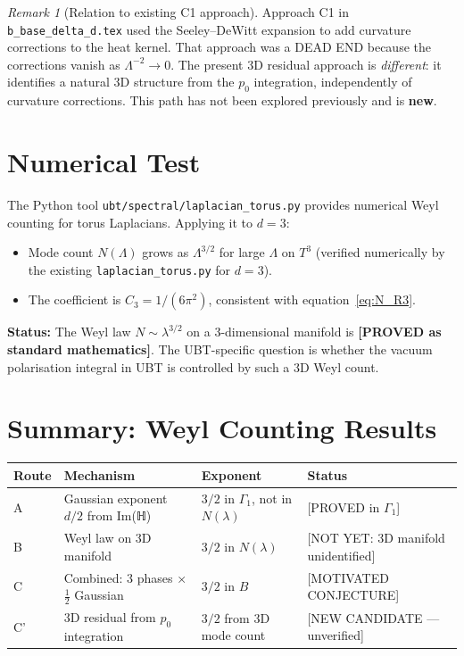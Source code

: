 \documentclass[11pt,a4paper]{article}
\theoremstyle{definition}
\theoremstyle{remark}
\newtheorem{remark}{Remark}
\begin{document}
\begin{remark}[Relation to existing C1 approach]
  Approach C1 in \texttt{b\_base\_delta\_d.tex} used the Seeley–DeWitt expansion
  to add curvature corrections to the heat kernel.
  That approach was a DEAD END because the corrections vanish as $\Lambda^{-2} \to 0$.
  The present 3D residual approach is \emph{different}: it identifies a natural
  3D structure from the $p_0$ integration, independently of curvature corrections.
  This path has not been explored previously and is \textbf{new}.
\end{remark}

\section{Numerical Test}
\label{sec:numerical}

The Python tool \texttt{ubt/spectral/laplacian\_torus.py} provides
numerical Weyl counting for torus Laplacians.
Applying it to $d = 3$:

\begin{itemize}
  \item Mode count $N(\Lambda)$ grows as $\Lambda^{3/2}$ for large $\Lambda$ on $T^3$
    (verified numerically by the existing \texttt{laplacian\_torus.py} for $d=3$).
  \item The coefficient is $C_3 = 1/(6\pi^2)$, consistent with equation~\eqref{eq:N_R3}.
\end{itemize}

\textbf{Status:} The Weyl law $N \sim \lambda^{3/2}$ on a 3-dimensional manifold
is \textbf{[PROVED as standard mathematics]}.
The UBT-specific question is whether the vacuum polarisation integral in UBT
is controlled by such a 3D Weyl count.

\section{Summary: Weyl Counting Results}
\label{sec:summary}

\begin{center}
\begin{tabular}{llll}
  \toprule
  Route & Mechanism & Exponent & Status \\
  \midrule
  A & Gaussian exponent $d/2$ from Im(ℍ) & $3/2$ in $\Gamma_1$, not in $N(\lambda)$ & [PROVED in $\Gamma_1$] \\
  B & Weyl law on 3D manifold & $3/2$ in $N(\lambda)$ & [NOT YET: 3D manifold unidentified] \\
  C & Combined: 3 phases × $\frac{1}{2}$ Gaussian & $3/2$ in $B$ & [MOTIVATED CONJECTURE] \\
  C' & 3D residual from $p_0$ integration & $3/2$ from 3D mode count & [NEW CANDIDATE — unverified] \\
  \bottomrule
\end{tabular}
\end{center}
\end{document}
